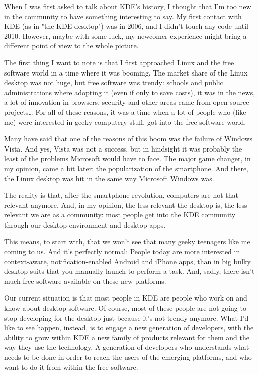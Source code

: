 

\noindent{}When I was first asked to talk about KDE’s history, I thought that I’m too new in the community to have something interesting to say. My first contact with KDE (as in "the KDE desktop") was in 2006, and I didn’t touch any code until 2010. However, maybe with some luck, my newcomer experience might bring a different point of view to the whole picture.

The first thing I want to note is that I first approached Linux and the free software world in a time where it was booming. The market share of the Linux desktop was not huge, but free software was trendy: schools and public administrations where adopting it (even if only to save costs), it was in the news, a lot of innovation in browsers, security and other areas came from open source projects… For all of these reasons, it was a time when a lot of people who (like me) were interested in geeky-computery-stuff, got into the free software world.

Many have said that one of the reasons of this boom was the failure of Windows Vista. And yes, Vista was not a success, but in hindsight it was probably the least of the problems Microsoft would have to face. The major game changer, in my opinion, came a bit later: the popularization of the smartphone. And there, the Linux desktop was hit in the same way Microsoft Windows was.

The reality is that, after the smartphone revolution, computers are not that relevant anymore. And, in my opinion, the less relevant the desktop is, the less relevant we are as a community: most people get into the KDE community through our desktop environment and desktop apps.

This means, to start with, that we won’t see that many geeky teenagers like me coming to us. And it’s perfectly normal: People today are more interested in context-aware, notification-enabled Android and iPhone apps, than in big bulky desktop suits that you manually launch to perform a task. And, sadly, there isn't much free software available on these new platforms.

Our current situation is that most people in KDE are people who work on and know about desktop software. Of course, most of these people are not going to stop developing for the desktop just because it’s not trendy anymore. What I’d like to see happen, instead, is to engage a new generation of developers, with the ability to grow within KDE a new family of products relevant for them and the way they use the technology. A generation of developers who understands what needs to be done in order to reach the users of the emerging platforms, and who want to do it from within the free software.

